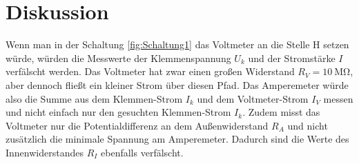 \section{Diskussion}
\label{sec:Diskussion}

Wenn man in der Schaltung \ref{fig:Schaltung1} das Voltmeter an die Stelle H
setzen würde, würden die Messwerte der Klemmenspannung $U_k$ und der
Stromstärke $I$ verfälscht werden. Das Voltmeter hat zwar einen großen
Widerstand $R_V = \SI{10}{\mega\ohm}$, aber dennoch fließt ein kleiner Strom
über diesen Pfad. Das Amperemeter würde also die Summe aus dem
Klemmen-Strom $I_k$ und dem Voltmeter-Strom $I_V$ messen und nicht einfach
nur den gesuchten Klemmen-Strom $I_k$.
Zudem misst das Voltmeter nur die Potentialdifferenz an dem Außenwiderstand
$R_A$ und nicht zusätzlich die minimale Spannung am Amperemeter. Dadurch
sind die Werte des Innenwiderstandes $R_I$ ebenfalls verfälscht.
